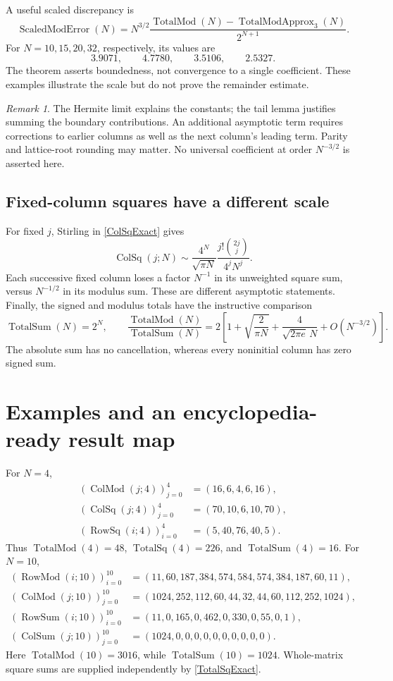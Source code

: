 \documentclass[11pt,reqno]{amsart}
\theoremstyle{remark}\newtheorem{remark}[theorem]{Remark}
\DeclareMathOperator{\RowSum}{RowSum}
\DeclareMathOperator{\ColSum}{ColSum}
\DeclareMathOperator{\TotalSum}{TotalSum}
\DeclareMathOperator{\RowSq}{RowSq}
\DeclareMathOperator{\ColSq}{ColSq}
\DeclareMathOperator{\TotalSq}{TotalSq}
\DeclareMathOperator{\RowMod}{RowMod}
\DeclareMathOperator{\ColMod}{ColMod}
\DeclareMathOperator{\TotalMod}{TotalMod}
\begin{document}
A useful scaled discrepancy is
\[
\operatorname{ScaledModError}(N)=N^{3/2}
\frac{\TotalMod(N)-\operatorname{TotalModApprox}_3(N)}{2^{N+1}}.
\]
For $N=10,15,20,32$, respectively, its values are
\[
3.9071,\qquad4.7780,\qquad3.5106,\qquad2.5327.
\]
The theorem asserts boundedness, not convergence to a single coefficient. These examples illustrate the scale but do not prove the remainder estimate.

\begin{remark}
The Hermite limit explains the constants; the tail lemma justifies summing the boundary contributions. An additional asymptotic term requires corrections to earlier columns as well as the next column's leading term. Parity and lattice-root rounding may matter. No universal coefficient at order $N^{-3/2}$ is asserted here.
\end{remark}

\subsection{Fixed-column squares have a different scale}
For fixed $j$, Stirling in \eqref{ColSqExact} gives
\[
\ColSq(j;N)\sim\frac{4^N}{\sqrt{\pi N}}\frac{j!\binom{2j}{j}}{4^jN^j}.
\]
Each successive fixed column loses a factor $N^{-1}$ in its unweighted square sum, versus $N^{-1/2}$ in its modulus sum. These are different asymptotic statements.
Finally, the signed and modulus totals have the instructive comparison
\[
\TotalSum(N)=2^N,\qquad
\frac{\TotalMod(N)}{\TotalSum(N)}
=2\left[1+\sqrt{\frac2{\pi N}}+
\frac4{\sqrt{2\pi e}\,N}+O(N^{-3/2})\right].
\]
The absolute sum has no cancellation, whereas every noninitial column has zero signed sum.

\section{Examples and an encyclopedia-ready result map}
For $N=4$,
\begin{align*}
(\ColMod(j;4))_{j=0}^4&=(16,6,4,6,16),\\
(\ColSq(j;4))_{j=0}^4&=(70,10,6,10,70),\\
(\RowSq(i;4))_{i=0}^4&=(5,40,76,40,5).
\end{align*}
Thus $\TotalMod(4)=48$, $\TotalSq(4)=226$, and $\TotalSum(4)=16$.
For $N=10$,
\begin{align*}
(\RowMod(i;10))_{i=0}^{10}&=(11,60,187,384,574,584,574,384,187,60,11),\\
(\ColMod(j;10))_{j=0}^{10}&=(1024,252,112,60,44,32,44,60,112,252,1024),\\
(\RowSum(i;10))_{i=0}^{10}&=(11,0,165,0,462,0,330,0,55,0,1),\\
(\ColSum(j;10))_{j=0}^{10}&=(1024,0,0,0,0,0,0,0,0,0,0).
\end{align*}
Here $\TotalMod(10)=3016$, while $\TotalSum(10)=1024$. Whole-matrix square sums are supplied independently by \eqref{TotalSqExact}.
\end{document}
